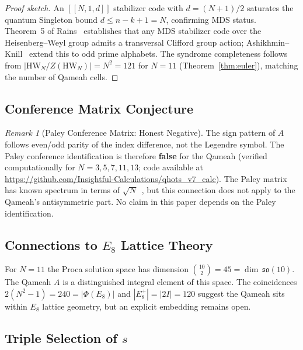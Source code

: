 \documentclass[aip,jmp,reprint,superscriptaddress,floatfix,nofootinbib]{revtex4-2}
\theoremstyle{definition}
\theoremstyle{remark}
\newtheorem{remark}[theorem]{Remark}
\newcommand{\HW}{\mathrm{HW}}
\begin{document}
\begin{proof}[Proof sketch]
An $[[N,1,d]]$ stabilizer code with $d = (N{+}1)/2$ saturates the
quantum Singleton bound $d \le n - k + 1 = N$, confirming MDS status.
Theorem~5 of Rains~\cite{Rains1999} establishes that any MDS stabilizer
code over the Heisenberg--Weyl group admits a transversal Clifford group
action; Ashikhmin--Knill~\cite{AshikhminKnill2001} extend this to odd prime
alphabets.  The syndrome completeness follows from
$|\HW_N / Z(\HW_N)| = N^2 = 121$ for $N = 11$
(Theorem~\ref{thm:euler}), matching the number of Qameah cells.
\end{proof}

\subsection{Conference Matrix Conjecture}
\label{sec:disc:conference}

\begin{remark}[Paley Conference Matrix: Honest Negative]
\label{rmk:paley-negative}
The sign pattern of $A$ follows even/odd parity of the index
difference, not the Legendre symbol.  The Paley conference
identification is therefore \textbf{false} for the Qameah (verified
computationally for $N = 3, 5, 7, 11, 13$; code available at
\url{https://github.com/Insightful-Calculations/qhots_v7_calc}).
The Paley matrix has known spectrum in terms of
$\sqrt{N}$~\cite{Paley1933}, but this connection does not apply to the
Qameah's antisymmetric part.  No claim in this paper depends on the
Paley identification.
\end{remark}

\subsection{Connections to \texorpdfstring{$E_8$}{E8} Lattice Theory}
\label{sec:disc:lattice}

For $N = 11$ the Proca solution space has dimension
$\binom{10}{2} = 45 = \dim\,\mathfrak{so}(10)$.  The Qameah $A$ is a
distinguished integral element of this space.  The coincidences
$2(N^2-1) = 240 = |\Phi(E_8)|$ and $|E_8^+| = |2I| = 120$ suggest
the Qameah sits within $E_8$ lattice geometry, but an explicit
embedding remains open.

\subsection{Triple Selection of \texorpdfstring{$s$}{s}}
\label{sec:triple-selection}
\end{document}
